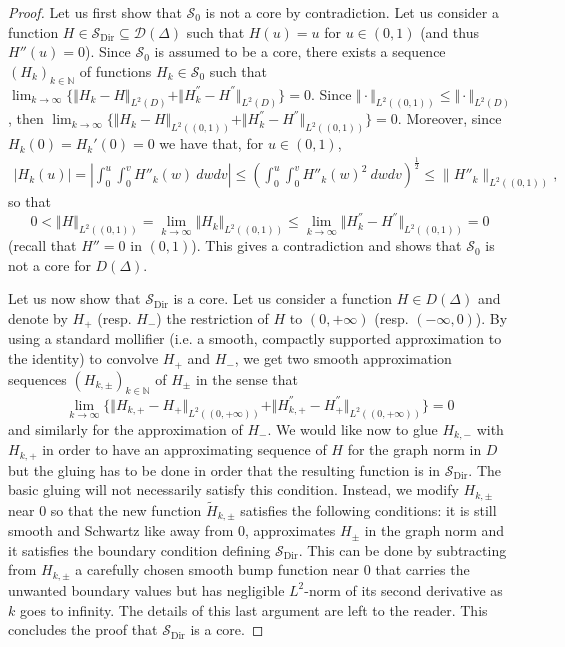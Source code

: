\documentclass[a4paper, reqno, 12pt]{amsart}
\theoremstyle{plain}
\theoremstyle{definition}
\newcommand{\Sdir}{\mathcal{S}_{\text{Dir}}}
\begin{document}
\begin{proof}
Let us first show that $\mathcal S_0$ is not a core by contradiction. Let us consider a function $H\in \Sdir \subseteq\mathcal D(\Delta)$ such that $H (u) = u$ for $u\in(0,1)$ (and thus $H'' (u) =0$). Since $\mathcal S_0$ is assumed to be a core, there exists a sequence $(H_k)_{k \in \mathbb N} $ of functions $H_k\in \mathcal S_0$ such that $\lim_{k \to \infty}  \big\{\Vert H_k -H \Vert_{L^2 (D)} + \Vert H_k^{''} -H^{''} \Vert_{L^2(D)} \big\} =0$. Since $\Vert \cdot \Vert_{L^2 ((0,1))} \le \Vert \cdot \Vert_{L^2 (D)}$, then $\lim_{k \to \infty}  \big\{\Vert H_k -H \Vert_{L^2 ((0,1))} + \Vert H_k^{''} -H^{''} \Vert_{L^2((0,1))} \big\} =0$. Moreover, since $H_k(0) = H_k'(0) = 0$ we have that, for $u\in(0,1)$,
    \begin{align*}
      \vert   H_k(u)  \vert = \left\vert \int_0^u\int_0^v H''_k(w) \ dw dv  \right\vert \leq \left(\int_0^u \int_0^v H''_k(w)^2\ dw dv\right)^{\frac{1}{2}} \leq \|H''_k\|_{L^2 ((0,1))} ,
    \end{align*}
    so that 
    \begin{equation*}
        0< \Vert H \Vert_{L^2((0,1))} = \lim_{k \to \infty} \Vert H_k \Vert_{L^2 ((0,1))} \le \lim_{k \to \infty} \Vert H_k^{''} -H^{''} \Vert_{L^2 ((0,1))} = 0
    \end{equation*}
(recall that $H'' = 0$ in $(0,1)$). This gives a contradiction and shows that $\mathcal S_0$ is not a core for $D(\Delta)$.  
\bigskip

Let us now show that $\Sdir$ is a core. Let us consider a function $H \in D(\Delta)$ and denote by $H_+$ (resp. $H_-$) the restriction of $H$ to $(0,+\infty)$ (resp. $(-\infty,0)$). By using a standard mollifier (i.e. a smooth, compactly supported approximation to the identity) to convolve  $H_+$ and $H_-$, we get two smooth approximation sequences $(H_{k,\pm})_{k \in \mathbb N}$ of $H_{\pm}$ in the sense that
\begin{equation*}
   \lim_{k \to \infty}  \big\{\Vert H_{k,+} -H_+ \Vert_{L^2 ((0,+\infty))} + \Vert H_{k,+}^{''} -H_{+}^{''} \Vert_{L^2((0,+\infty))} \big\} =0 
\end{equation*}
and similarly for the approximation of $H_-$. We would like now to glue $H_{k,-}$ with $H_{k,+}$ in order to have an approximating sequence of $H$ for the graph norm in $D$ but the gluing has to be done in order that the resulting function is in $\Sdir$. The basic gluing will not necessarily satisfy this condition. Instead, we modify $H_{k,\pm}$ near $0$ so that the new function $\tilde H_{k,\pm}$ satisfies the following conditions:  it is still smooth and Schwartz like away from $0$, approximates $H_\pm$ in the graph norm and  it satisfies the boundary condition defining $\Sdir$. This can be done by subtracting from $H_{k,\pm}$ a carefully chosen smooth bump function near $0$ that carries the unwanted boundary values but has negligible $L^2$-norm of its second derivative as $k$ goes to infinity. The details of this last argument are left to the reader. This concludes the proof that $\Sdir$ is a core.         

\end{proof}
\end{document}
